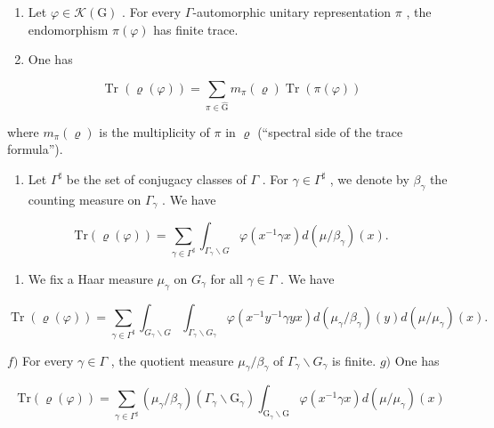 \begin{enumerate}
\def\labelenumi{\alph{enumi})}
\setcounter{enumi}{1}
\item
  Let \(\varphi\in\mathcal{K}(\mathrm{G})\) . For every \(\Gamma\)-automorphic unitary representation \(\pi\) , the endomorphism \(\pi(\varphi)\) has finite trace.
\item
  One has
\end{enumerate}

\[
\operatorname{Tr} (\varrho (\varphi)) = \sum_ {\pi \in \widehat {\mathrm{G}}} m _ {\pi} (\varrho) \operatorname{Tr} (\pi (\varphi))
\]

where \(m_{\pi}(\varrho)\) is the multiplicity of \(\pi\) in \(\varrho\) (“spectral side of the trace formula”).

\begin{enumerate}
\def\labelenumi{\alph{enumi})}
\setcounter{enumi}{3}
\tightlist
\item
  Let \(\Gamma^{\sharp}\) be the set of conjugacy classes of \(\Gamma\) . For \(\gamma \in \Gamma^{\sharp}\) , we denote by \(\beta_{\gamma}\) the counting measure on \(\Gamma_{\gamma}\) . We have
\end{enumerate}

\[
\mathrm{Tr} (\varrho (\varphi)) = \sum_ {\gamma \in \Gamma^ {\sharp}} \int_ {\Gamma_ {\gamma} \backslash G} \varphi (x ^ {- 1} \gamma x) d (\mu / \beta_ {\gamma}) (x).
\]

\begin{enumerate}
\def\labelenumi{\alph{enumi})}
\setcounter{enumi}{4}
\tightlist
\item
  We fix a Haar measure \(\mu_{\gamma}\) on \(G_{\gamma}\) for all \(\gamma \in \Gamma\) . We have
\end{enumerate}

\[
\operatorname{Tr} (\varrho (\varphi)) = \sum_ {\gamma \in \Gamma^ {\sharp}} \int_ {G _ {\gamma} \backslash G} \int_ {\Gamma_ {\gamma} \backslash G _ {\gamma}} \varphi (x ^ {- 1} y ^ {- 1} \gamma y x) d (\mu_ {\gamma} / \beta_ {\gamma}) (y) d (\mu / \mu_ {\gamma}) (x).
\]

\(f)\) For every \(\gamma \in \Gamma\) , the quotient measure \(\mu_{\gamma} / \beta_{\gamma}\) of \(\Gamma_{\gamma} \backslash G_{\gamma}\) is finite. \(g)\) One has

\[
\mathrm{Tr} (\varrho (\varphi)) = \sum_ {\gamma \in \Gamma^ {\sharp}} (\mu_ {\gamma} / \beta_ {\gamma}) (\Gamma_ {\gamma} \backslash \mathrm{G} _ {\gamma}) \int_ {\mathrm{G} _ {\gamma} \backslash \mathrm{G}} \varphi (x ^ {- 1} \gamma x) d (\mu / \mu_ {\gamma}) (x)
\]

